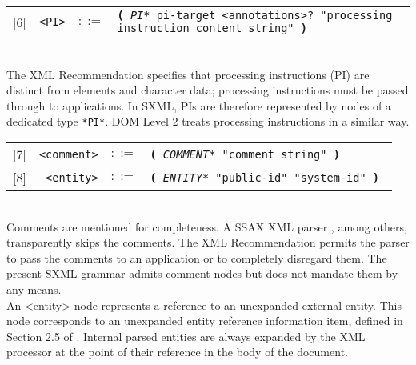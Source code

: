 \documentclass[10pt]{article}
\begin{document}
\begin{tabular}{rrcp{2.8in}}
{[}6{]} & \texttt{<PI>} &  $::=$ & \texttt{\textbf{(} {\itshape *PI*} pi-target <annotations>? "processing instruction content string" \textbf{)} } \\
\end{tabular}
\\
The XML Recommendation specifies that processing instructions
 (PI) are distinct from elements and character data; processing
instructions must be passed through to applications. In SXML, PIs are
therefore represented by nodes of a dedicated type \texttt{*PI*}. DOM Level 2 treats processing instructions in a similar way.

\begin{tabular}{rrcp{2.8in}}
{[}7{]} & \texttt{<comment>} &  $::=$ & \texttt{\textbf{(} {\itshape *COMMENT*} "comment string" \textbf{)} } \\
{[}8{]} & \texttt{<entity>} &  $::=$ & \texttt{\textbf{(} {\itshape *ENTITY*} "public-id" "system-id" \textbf{)} } \\
\end{tabular}
\\
Comments are mentioned for completeness. A SSAX XML parser
\cite{SSAX}, among others, transparently skips the comments.
The XML Recommendation permits the parser to pass the comments to
an application or to completely disregard them. The present SXML grammar
admits comment nodes but does not mandate them by any means.\\ An <entity> node represents a reference to an
unexpanded external entity. This node corresponds to an unexpanded
entity reference information item, defined in Section 2.5 of \cite{XML Infoset}. Internal parsed entities are always expanded by the
XML processor at the point of their reference in the body of the
document.
\end{document}

